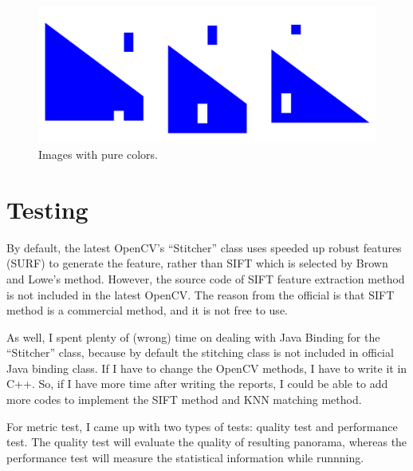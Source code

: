\documentclass[10pt,twocolumn,letterpaper]{article}
\begin{document}
\begin{figure}[t]
    \begin{center}
        \includegraphics[width=0.9\linewidth]{pure_color}
    \end{center}
    \caption{Images with pure colors.}
    \label{fig:pc}
\end{figure}


\section{Testing}
By default, the latest OpenCV's ``Stitcher'' class uses speeded up robust features (SURF) \cite{surf} to generate the feature,
rather than SIFT which is selected by Brown and Lowe's method.
However, the source code of SIFT feature extraction method is not included in the latest OpenCV.
The reason from the official \cite{cvcontri} is that SIFT method is a commercial method, and it is not free to use.

As well, I spent plenty of (wrong) time on dealing with Java Binding for the ``Stitcher'' class,
because by default the stitching class is not included in official Java binding class.
If I have to change the OpenCV methods, I have to write it in C++.
So, if I have more time after writing the reports, I could be able to add more codes to implement the SIFT method and KNN matching method.

For metric test, I came up with two types of tests: quality test and performance test.
The quality test will evaluate the quality of resulting panorama, whereas the performance test will measure the statistical information while runnning.
\end{document}

